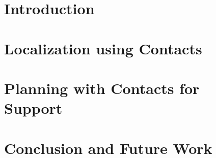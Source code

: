 \documentclass[12pt]{cmuthesis}
\begin{document}
\chapter{Introduction}


\chapter{Localization using Contacts}


\chapter{Planning with Contacts for Support}


\chapter{Conclusion and Future Work}


%

\backmatter


\renewcommand{\bibsection}{\chapter{\bibname}}

\end{document}
